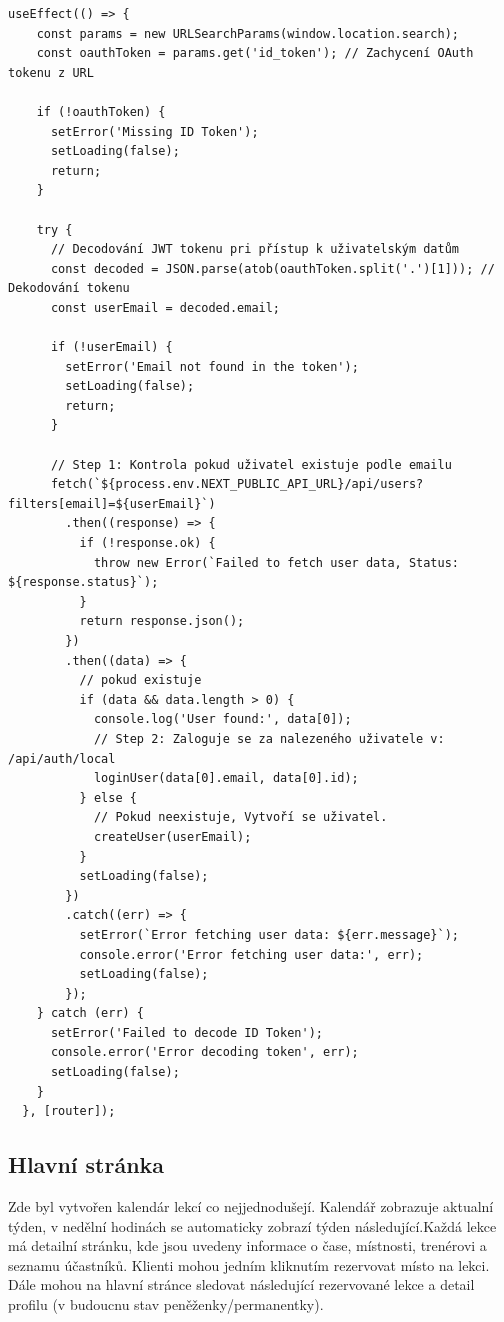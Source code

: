 \documentclass[12pt, a4paper,
openright
]{report}
\begin{document}
\begin{lstlisting}[style=JavaScript, title={Kód}, caption={Ukázka řešení oauth loginu}, basicstyle=\footnotesize\ttfamily]
	useEffect(() => {
    const params = new URLSearchParams(window.location.search);
    const oauthToken = params.get('id_token'); // Zachycení OAuth tokenu z URL

    if (!oauthToken) {
      setError('Missing ID Token');
      setLoading(false);
      return;
    }

    try {
      // Decodování JWT tokenu pri přístup k uživatelským datům
      const decoded = JSON.parse(atob(oauthToken.split('.')[1])); // Dekodování tokenu
      const userEmail = decoded.email; 

      if (!userEmail) {
        setError('Email not found in the token');
        setLoading(false);
        return;
      }

      // Step 1: Kontrola pokud uživatel existuje podle emailu
      fetch(`${process.env.NEXT_PUBLIC_API_URL}/api/users?filters[email]=${userEmail}`)
        .then((response) => {
          if (!response.ok) {
            throw new Error(`Failed to fetch user data, Status: ${response.status}`);
          }
          return response.json();
        })
        .then((data) => {
          // pokud existuje
          if (data && data.length > 0) {
            console.log('User found:', data[0]);
            // Step 2: Zaloguje se za nalezeného uživatele v: /api/auth/local
            loginUser(data[0].email, data[0].id);
          } else {
            // Pokud neexistuje, Vytvoří se uživatel.
            createUser(userEmail);
          }
          setLoading(false); 
        })
        .catch((err) => {
          setError(`Error fetching user data: ${err.message}`);
          console.error('Error fetching user data:', err);
          setLoading(false);
        });
    } catch (err) {
      setError('Failed to decode ID Token');
      console.error('Error decoding token', err);
      setLoading(false);
    }
  }, [router]);
\end{lstlisting}
\subsection{Hlavní stránka}
Zde byl vytvořen kalendár lekcí co nejjednodušejí. Kalendář zobrazuje aktualní týden, v nedělní hodinách se automaticky zobrazí týden následující.Každá lekce má detailní stránku, kde jsou uvedeny informace o čase, místnosti, trenérovi a seznamu účastníků. Klienti mohou jedním kliknutím rezervovat místo na lekci. Dále mohou na hlavní stránce sledovat následující rezervované lekce a detail profilu (v budoucnu stav peněženky/permanentky).
\end{document}
